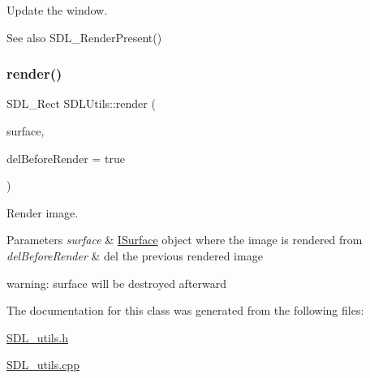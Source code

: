 Update the window. 

\begin{DoxySeeAlso}{See also}
S\+D\+L\+\_\+\+Render\+Present() 
\end{DoxySeeAlso}
\mbox{\label{class_s_d_l_utils_a5b0a6dd7f5f0b8bd7a06527c39d8a666}} 
\subsubsection{\texorpdfstring{render()}{render()}}
{\footnotesize\ttfamily S\+D\+L\+\_\+\+Rect S\+D\+L\+Utils\+::render (\begin{DoxyParamCaption}\item[{\mbox{\hyperlink{class_i_surface}{I\+Surface}} $\ast$}]{surface,  }\item[{bool}]{del\+Before\+Render = {\ttfamily true} }\end{DoxyParamCaption})\hspace{0.3cm}{\ttfamily [virtual]}}



Render image. 


\begin{DoxyParams}{Parameters}
{\em surface} & \mbox{\hyperlink{class_i_surface}{I\+Surface}} object where the image is rendered from \\
\hline
{\em del\+Before\+Render} & del the previous rendered image\\
\hline
\end{DoxyParams}
warning\+: surface will be destroyed afterward 

The documentation for this class was generated from the following files\+:\begin{DoxyCompactItemize}
\item 
\mbox{\hyperlink{_s_d_l__utils_8h}{S\+D\+L\+\_\+utils.\+h}}\item 
\mbox{\hyperlink{_s_d_l__utils_8cpp}{S\+D\+L\+\_\+utils.\+cpp}}\end{DoxyCompactItemize}
